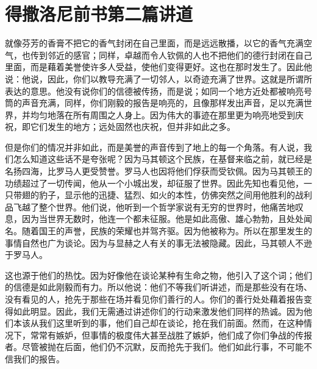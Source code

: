 
\section{得撒洛尼前书第二篇讲道}

\par

\par

就像芬芳的香膏不把它的香气封闭在自己里面，而是远远散播，以它的香气充满空气，也传到邻近的感官；同样，卓越而令人钦佩的人也不把他们的德行封闭在自己里面，而是藉着美誉使许多人受益，使他们变得更好。这也在那时发生了。因此他说：他说，因此，你们以教导充满了一切邻人，以奇迹充满了世界。这就是所谓所表达的意思。他没有说你们的信德被传扬，而是说；如同一个地方近处都被响亮号筒的声音充满，同样，你们刚毅的报告是响亮的，且像那样发出声音，足以充满世界，并均匀地落在所有周围之人身上。因为伟大的事迹在那里更为响亮地受到庆祝，即它们发生的地方；远处固然也庆祝，但并非如此之多。\par

但是你们的情况并非如此，而是美誉的声音传到了地上的每一个角落。有人说，我们怎么知道这些话不是夸张呢？因为马其顿这个民族，在基督来临之前，就已经是名扬四海，比罗马人更受赞誉。罗马人也因将他们俘获而受钦佩。因为马其顿王的功绩超过了一切传闻，他从一个小城出发，却征服了世界。因此先知也看见他，一只带翅的豹子，显示他的迅捷、猛烈、如火的本性，仿佛突然之间用他胜利的战利品飞越了整个世界。他们说，他听到一个哲学家说有无穷的世界时，他痛苦地叹息，因为当世界无数时，他连一个都未征服。他是如此高傲、雄心勃勃，且处处闻名。随着国王的声誉，民族的荣耀也并驾齐驱。因为他被称为。所以在那里发生的事情自然也广为谈论。因为与显赫之人有关的事无法被隐藏。因此，马其顿人不逊于罗马人。\par

这也源于他们的热忱。因为好像他在谈论某种有生命之物，他引入了这个词；他们的信德是如此刚毅而有力。所以他说：他们不等我们听讲述，而是那些没有在场、没有看见的人，抢先于那些在场并看见你们善行的人。你们的善行处处藉着报告变得如此明显。因此，我们无需通过讲述你们的行动来激发他们同样的热诚。因为他们本该从我们这里听到的事，他们自己却在谈论，抢在我们前面。然而，在这种情况下，常常有嫉妒，但事情的极度伟大甚至战胜了嫉妒，他们成了你们争战的传报者。尽管被抛在后面，他们仍不沉默，反而抢先于我们。他们如此行事，不可能不信我们的报告。\par

